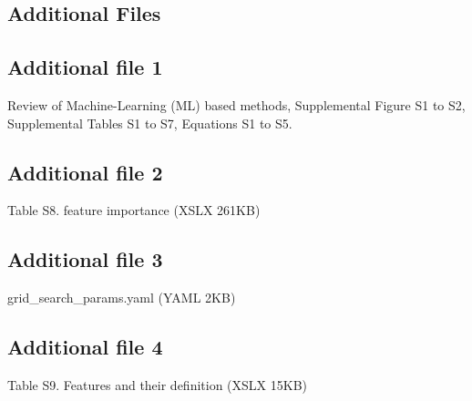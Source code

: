\documentclass{bmcart}
\begin{document}
\begin{backmatter}
\clearpage

\section*{Additional Files}
  \subsection*{Additional file 1} \label{add:figs_tbls}
    Review of Machine-Learning (ML) based methods,
    Supplemental Figure S1 to S2, 
    Supplemental Tables S1 to S7,
    Equations S1 to S5.
   
  \subsection*{Additional file 2}  \label{add:feature importance}
  Table S8. feature importance (XSLX 261KB)

 \subsection*{Additional file 3}  \label{add:hyperoptparams}
   grid\_search\_params.yaml (YAML 2KB)

 \subsection*{Additional file 4}  \label{add:feature_definition}
  Table S9. Features and their definition (XSLX 15KB)


\end{backmatter}
\end{document}
